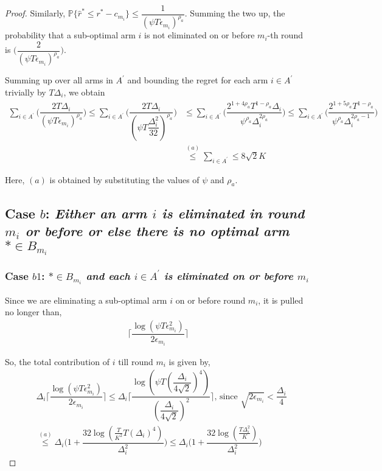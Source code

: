 \begin{proof}
 
Similarly, $\mathbb{P}\lbrace\hat{r}^{*}\leq r^{*} - c_{m_i}\rbrace\leq \dfrac{1}{(\psi  T\epsilon_{m_{i}})^{\rho_{a}}}$. Summing the two up, the probability that a sub-optimal arm ${i}$ is not eliminated on or before $m_{i}$-th round is  $\bigg(\dfrac{2}{(\psi T\epsilon_{m_{i}})^{\rho_{a}}}\bigg)$. 
 
Summing up over all arms in $A^{'}$ and bounding the regret for each arm $i\in A^{'}$ trivially by $T\Delta_{i}$, we obtain
   \begin{align*}
\sum_{i\in A^{'}}\bigg(\dfrac{2T\Delta_{i}}{(\psi T\epsilon_{m_{i}})^{\rho_{a}}}\bigg)
\leq\sum_{i\in A^{'}}\bigg(\dfrac{2T\Delta_{i}}{(\psi T\dfrac{\Delta_{i}^{2}}{32})^{\rho_{a}}}\bigg)
&\leq \sum_{i\in A^{'}}\bigg(\dfrac{2^{1+4\rho_{a}}T^{1-\rho_{a}}\Delta_{i}}{\psi^{\rho_{a}}\Delta_{i}^{2\rho_{a}}}\bigg)
\leq \sum_{i\in A^{'}}\bigg(\dfrac{2^{1+5\rho_{a}}T^{1-\rho_{a}}}{\psi^{\rho_{a}}\Delta_{i}^{2\rho_{a}-1}}\bigg)\\  
& \overset{(a)}{\leq}\sum_{i\in A^{'}}\leq 8\sqrt{2} K
   \end{align*}

Here, $(a)$ is obtained by substituting the values of $\psi$ and $\rho_a$.

\subsection*{Case $b$: \textit{Either an arm ${i}$ is eliminated in round $m_{i}$ or before or else there is no optimal arm ${*}\in B_{m_{i}}$ }}

\subsubsection*{Case $b1$: \textit{${*}\in B_{m_{i}}$ and each ${i}\in A^{'}$ is  eliminated on or before $m_{i}$ } }

 Since we are eliminating a sub-optimal arm ${i}$ on or before round $m_{i}$, it is pulled no longer than, 
 \begin{align*}
  \bigg\lceil\dfrac{\log{(\psi T\epsilon_{m_{i}}^{2})}}{2\epsilon_{m_{i}}}\bigg\rceil
 \end{align*}

So, the total contribution of ${i}$  till round $m_{i}$ is given by, 
\begin{align*}
&\Delta_{i}\bigg\lceil\dfrac{\log{(\psi T\epsilon_{m_{i}}^{2})}}{2\epsilon_{m_{i}}}\bigg\rceil
\leq\Delta_{i}\bigg\lceil\dfrac{\log{(\psi T(\dfrac{\Delta_{i}}{4\sqrt{2}})^{4})}}{(\dfrac{\Delta_{i}}{4\sqrt{2}})^{2}}\bigg\rceil \text{, since } \sqrt{2\epsilon_{m_{i}}} < \dfrac{\Delta_{i}}{4}\\
&\overset{(a)}{\leq}\Delta_{i}\bigg(1+\dfrac{32\log{(\frac{T}{K^2} T(\Delta_{i})^{4})}}{\Delta_{i}^{2}}\bigg)
\leq\Delta_{i}\bigg(1+\dfrac{32\log{( \frac{T\Delta_i^2}{K})}}{\Delta_{i}^{2}}\bigg)
\end{align*} 
 

\end{proof}

